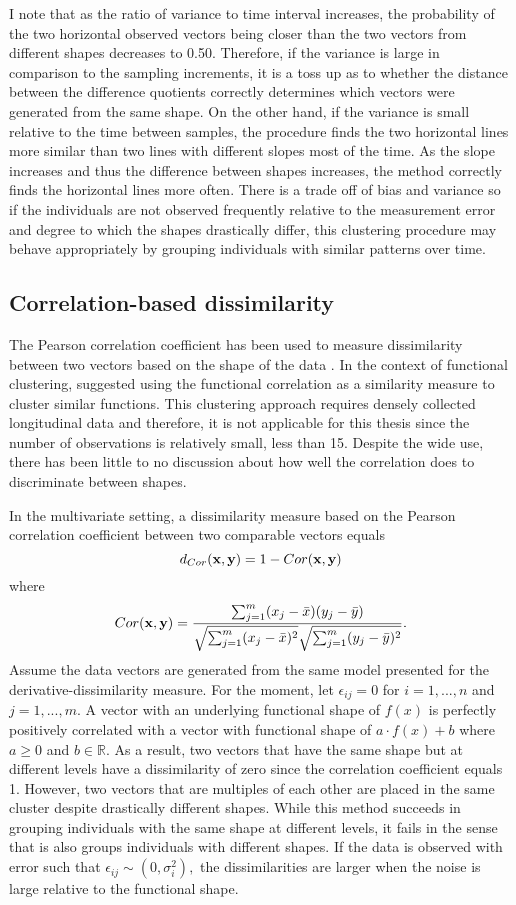 I note that as the ratio of variance to time interval increases, the probability of the two horizontal observed vectors being closer than the two vectors from different shapes decreases to 0.50. Therefore, if the variance is large in comparison to the sampling increments, it is a toss up as to whether the distance between the difference quotients correctly determines which vectors were generated from the same shape. On the other hand, if the variance is small relative to the time between samples, the procedure finds the two horizontal lines more similar than two lines with different slopes most of the time. As the slope increases and thus the difference between shapes increases, the method correctly finds the horizontal lines more often. There is a trade off of bias and variance so if the individuals are not observed frequently relative to the measurement error and degree to which the shapes drastically differ, this clustering procedure may behave appropriately by grouping individuals with similar patterns over time. 

\subsection{Correlation-based dissimilarity}
The Pearson correlation coefficient has been used to measure dissimilarity between two vectors based on the shape of the data  \cite{chouakria2007,  eisen1998, chiou2008}. In the context of functional clustering, \textcite{chiou2008} suggested using the functional correlation as a similarity measure to cluster similar functions. This clustering approach requires densely collected longitudinal data and therefore, it is not applicable for this thesis since the number of observations is relatively small, less than 15. Despite the wide use, there has been little to no discussion about how well the correlation does to discriminate between shapes.

In the multivariate setting, a dissimilarity measure based on the Pearson correlation coefficient between two comparable vectors equals 
$$d_{Cor}(\mathbf x,\mathbf y) = 1-Cor(\mathbf x,\mathbf y)$$ 
where $$Cor(\mathbf x,\mathbf y) = \frac{\sum^{m}_{j=1}(x_{j}-\bar{x})(y_{j}-\bar{y})}{\sqrt{\sum^{m}_{j=1}(x_{j}-\bar{x})^{2}}\sqrt{\sum^{m}_{j=1}(y_{j}-\bar{y})^{2}}}.$$
Assume the data vectors are generated from the same model presented for the derivative-dissimilarity measure. For the moment, let $\epsilon_{ij}=0$ for $i=1,...,n$ and $j=1,...,m$. A vector with an underlying functional shape of $f(x)$ is perfectly positively correlated with a vector with functional shape of $a\cdot f(x) + b$ where $a\geq0$ and $b\in\mathbb{R}$. As a result, two vectors that have the same shape but at different levels have a dissimilarity of zero since the correlation coefficient equals 1. However, two vectors that are multiples of each other are placed in the same cluster despite drastically different shapes. While this method succeeds in grouping individuals with the same shape at different levels, it fails in the sense that is also groups individuals with different shapes. If the data is observed with error such that $\epsilon_{ij}\sim(0,\sigma_{i}^{2}),$ the dissimilarities are larger when the noise is large relative to the functional shape. 

